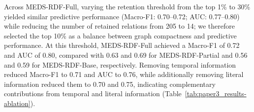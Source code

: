 Across MEDS-RDF-Full, varying the retention threshold from the top 1\% to 30\% yielded similar predictive performance (Macro-F1: 0.70--0.72; AUC: 0.77--0.80) while reducing the number of retained relations from 205 to 14; we therefore selected the top 10\% as a balance between graph compactness and predictive performance. At this threshold, MEDS-RDF-Full achieved a Macro-F1 of 0.72 and AUC of 0.80, compared with 0.63 and 0.69 for MEDS-RDF-Partial and 0.56 and 0.59 for MEDS-RDF-Base, respectively. Removing temporal information reduced Macro-F1 to 0.71 and AUC to 0.76, while additionally removing literal information reduced them to 0.70 and 0.75, indicating complementary contributions from temporal and literal information (Table~\ref{tab:paper3_results-ablation}).

\begin{table}[htbp]
\centering
\caption{Configuration ablation on \emph{First 24h in-hospital mortality}: SHAP-pruning threshold (retained top-percentile of relations by importance), literal/temporal information, and resulting graph size. Experiments use RGCN2+lit with all-MiniLM-L6-v2 for textual values, except \emph{Full (no-time; no-txt)}, where no sentence transformer is used.}
\label{tab:paper3_results-ablation}
\end{table}
